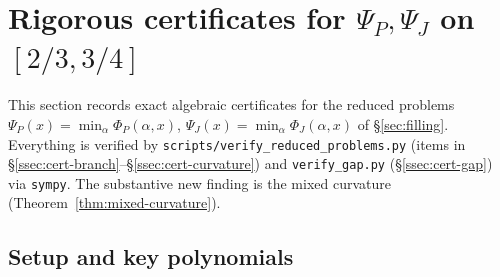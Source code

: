 \documentclass[11pt]{amsart}
\theoremstyle{definition}
\newcommand{\1}{\mathbf 1}
\begin{document}
\section{Rigorous certificates for $\Psi_P,\Psi_J$ on $[2/3,3/4]$}
\label{sec:certificates}

This section records exact algebraic certificates for the reduced problems
$\Psi_P(x)=\min_\alpha\Phi_P(\alpha,x)$, $\Psi_J(x)=\min_\alpha\Phi_J(\alpha,x)$
of \S\ref{sec:filling}.  Everything is verified by
\texttt{scripts/verify\_reduced\_problems.py} (items in
\S\ref{ssec:cert-branch}--\S\ref{ssec:cert-curvature}) and
\texttt{verify\_gap.py} (\S\ref{ssec:cert-gap}) via \texttt{sympy}.  The
substantive new finding is the mixed curvature
(Theorem~\ref{thm:mixed-curvature}).

\subsection{Setup and key polynomials}
\end{document}

